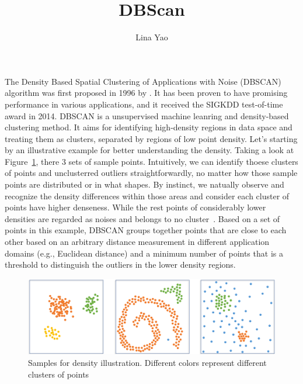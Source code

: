 \title{DBScan}
\label{chp:dbscan}
\author{Lina Yao}
\maketitle


The Density Based Spatial Clustering of Applications with Noise (DBSCAN) 
algorithm was first proposed in 1996 by \cite{ester1996density}. It has been 
proven to have promising performance in various applications, and it received 
the SIGKDD test-of-time award in 2014.  DBSCAN is a unsupervised machine leanring and density-based clustering method. 
It aims for identifying high-density regions in data space and treating them as 
clusters, separated by regions of low point density. Let's starting by an 
illustrative example for better understanding the density. Taking a look at Figure~\ref{fig:example}, there 3 sets of sample points. Intuitively, we can identify thoese clusters of points and unclusterred outliers straightforwardly, no matter how those sample points are distributed or in what shapes. By instinct, we natually observe and recognize the density differences within those areas and consider each cluster of points have higher denseness. While the rest points of considerably lower densities are regarded as noises and belongs to no cluster~\cite{ester1996density}. Based on a set of points in this 
example, DBSCAN groups together points that are close to each other based on an 
arbitrary distance measurement in different application domains 
(e.g., Euclidean distance) and a minimum number of points that is a threshold to 
distinguish the outliers in the lower density regions. 


\begin{figure}[tbp]
	\centering
	\label{fig:example}
	\includegraphics[width=\textwidth]{"Part 3 - Learning Systems/Unsupervised Learning/DBScan/figures/example_density.png"}
	\caption{Samples for density illustration. Different colors represent different clusters of points}
\end{figure}


